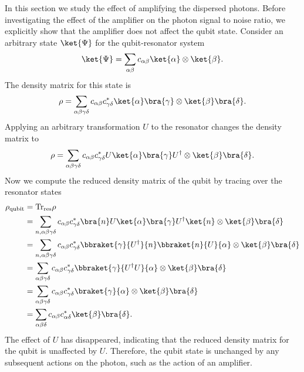 
In this section we study the effect of amplifying the dispersed photons.
Before investigating the effect of the amplifier on the photon signal to noise ratio, we explicitly show that the amplifier does not affect the qubit state.
Consider an arbitrary state $\ket{\Psi}$ for the qubit-resonator system \begin{equation}
\ket{\Psi} = \sum_{\alpha \beta} c_{\alpha \beta} \ket{\alpha} \otimes \ket{\beta} . \end{equation}
The density matrix for this state is \begin{equation}
\rho = \sum_{\alpha \beta \gamma \delta} c_{\alpha \beta}c_{\gamma \delta}^* \ket{\alpha}\bra{\gamma}\otimes \ket{\beta}\bra{\delta} . \end{equation}
Applying an arbitrary transformation $U$ to the resonator changes the density matrix to \begin{equation}
\rho = \sum_{\alpha \beta \gamma \delta} c_{\alpha \beta}c_{\gamma \delta}^* U\ket{\alpha}\bra{\gamma}U^{\dagger} \otimes \ket{\beta}\bra{\delta} . \end{equation}
Now we compute the reduced density matrix of the qubit by tracing over the resonator states \begin{align}
\rho_{\text{qubit}} &= \text{Tr}_{\text{res}} \rho \\
&= \sum_{n, \alpha \beta \gamma \delta} c_{\alpha \beta} c_{\gamma \delta}^* \bra{n}U\ket{\alpha}\bra{\gamma}U^{\dagger}\ket{n} \otimes \ket{\beta}\bra{\delta} \\
&= \sum_{n, \alpha \beta \gamma \delta} c_{\alpha \beta} c_{\gamma \delta}^* \bbraket{\gamma}{U^{\dagger}}{n} \bbraket{n}{U}{\alpha} \otimes \ket{\beta}\bra{\delta} \\
&= \sum_{\alpha \beta \gamma \delta} c_{\alpha \beta} c_{\gamma \delta}^* \bbraket{\gamma}{U^{\dagger}U}{\alpha} \otimes \ket{\beta}\bra{\delta} \\
&= \sum_{\alpha \beta \gamma \delta} c_{\alpha \beta} c_{\gamma \delta}^* \braket{\gamma}{\alpha} \otimes \ket{\beta}\bra{\delta} \\
&= \sum_{\alpha \beta \delta} c_{\alpha \beta} c_{\alpha \delta}^* \ket{\beta}\bra{\delta} .
\end{align}
The effect of $U$ has disappeared, indicating that the reduced density matrix for the qubit is unaffected by $U$.
Therefore, the qubit state is unchanged by any subsequent actions on the photon, such as the action of an amplifier.

